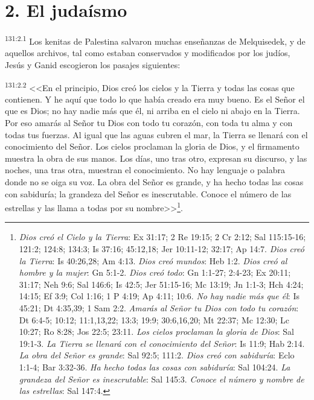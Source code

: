 \section*{2. El judaísmo}
\par 
\textsuperscript{131:2.1} Los kenitas de Palestina salvaron muchas enseñanzas de Melquisedek, y de aquellos archivos, tal como estaban conservados y modificados por los judíos, Jesús y Ganid escogieron los pasajes siguientes:

\par 
\textsuperscript{131:2.2} <<En el principio, Dios creó los cielos y la Tierra y todas las cosas que contienen. Y he aquí que todo lo que había creado era muy bueno. Es el Señor el que es Dios; no hay nadie más que él, ni arriba en el cielo ni abajo en la Tierra. Por eso amarás al Señor tu Dios con todo tu corazón, con toda tu alma y con todas tus fuerzas. Al igual que las aguas cubren el mar, la Tierra se llenará con el conocimiento del Señor. Los cielos proclaman la gloria de Dios, y el firmamento muestra la obra de sus manos. Los días, uno tras otro, expresan su discurso, y las noches, una tras otra, muestran el conocimiento. No hay lenguaje o palabra donde no se oiga su voz. La obra del Señor es grande, y ha hecho todas las cosas con sabiduría; la grandeza del Señor es inescrutable. Conoce el número de las estrellas y las llama a todas por su nombre>>\footnote{\textit{Dios creó el Cielo y la Tierra}: Ex 31:17; 2 Re 19:15; 2 Cr 2:12; Sal 115:15-16; 121:2; 124:8; 134:3; Is 37:16; 45:12,18; Jer 10:11-12; 32:17; Ap 14:7. \textit{Dios creó la Tierra}: Is 40:26,28; Am 4:13. \textit{Dios creó mundos}: Heb 1:2. \textit{Dios creó al hombre y la mujer}: Gn 5:1-2. \textit{Dios creó todo}: Gn 1:1-27; 2:4-23; Ex 20:11; 31:17; Neh 9:6; Sal 146:6; Is 42:5; Jer 51:15-16; Mc 13:19; Jn 1:1-3; Hch 4:24; 14:15; Ef 3:9; Col 1:16; 1 P 4:19; Ap 4:11; 10:6. \textit{No hay nadie más que él}: Is 45:21; Dt 4:35,39; 1 Sam 2:2. \textit{Amarás al Señor tu Dios con todo tu corazón}: Dt 6:4-5; 10:12; 11:1,13,22; 13:3; 19:9; 30:6,16,20; Mt 22:37; Mc 12:30; Lc 10:27; Ro 8:28; Jos 22:5; 23:11. \textit{Los cielos proclaman la gloria de Dios}: Sal 19:1-3. \textit{La Tierra se llenará con el conocimiento del Señor}: Is 11:9; Hab 2:14. \textit{La obra del Señor es grande}: Sal 92:5; 111:2. \textit{Dios creó con sabiduría}: Eclo 1:1-4; Bar 3:32-36. \textit{Ha hecho todas las cosas con sabiduría}: Sal 104:24. \textit{La grandeza del Señor es inescrutable}: Sal 145:3. \textit{Conoce el número y nombre de las estrellas}: Sal 147:4.}.

